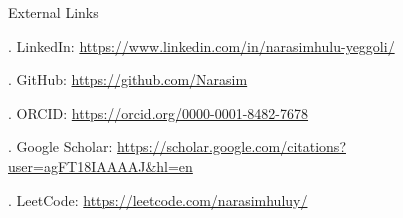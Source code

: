 \documentclass{resume} %
\begin{document}
\begin{rSection}{External Links}
	
	\begin{rSubsection}{}{}{}{}	
		\item[.] LinkedIn: \hspace{1.5cm} \href{https://www.linkedin.com/in/narasimhulu-yeggoli/}{https://www.linkedin.com/in/narasimhulu-yeggoli/}
		\item[.] GitHub: \hspace{1.8cm} \href{https://github.com/Narasim}{https://github.com/Narasim}
		\item[.] ORCID: \hspace{1.8cm} \href{https://orcid.org/0000-0001-8482-7678}{https://orcid.org/0000-0001-8482-7678}
		\item[.] Google Scholar:  \hspace{0.5cm}
		\href{https://scholar.google.com/citations?user=agFT18IAAAAJ\&hl=en}{https://scholar.google.com/citations?user=agFT18IAAAAJ\&hl=en}
		\item[.] LeetCode: \hspace{1.4cm} \href{https://leetcode.com/narasimhuluy/}{https://leetcode.com/narasimhuluy/}
		
		
	\end{rSubsection}	
	
\end{rSection}
\end{document}
